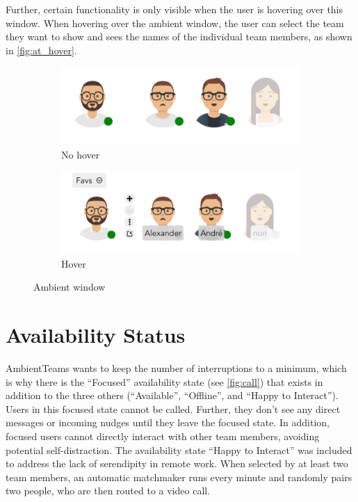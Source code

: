 Further, certain functionality is only visible when the user is hovering over this window. When hovering over the ambient window, the user can select the team they want to show and sees the names of the individual team members, as shown in \autoref{fig:at_hover}.

\begin{figure}[h]
    \centering
    \begin{subfigure}{.5\textwidth}
        \centering
        \includegraphics[width=.8\linewidth]{./images/AT_no_hover.png}
        \caption{No hover }
        \label{fig:at_no_hover}
    \end{subfigure}%
    \begin{subfigure}{.5\textwidth}
        \centering
        \includegraphics[width=.8\linewidth]{./images/AT_hover.png}
        \caption{Hover }
        \label{fig:at_hover}
    \end{subfigure}
    \caption{Ambient window}
\end{figure}

\section{Availability Status}
AmbientTeams wants to keep the number of interruptions to a minimum, which is why there is the \enquote{Focused} availability state (see \autoref{fig:call}) that exists in addition to the three others (\enquote{Available}, \enquote{Offline}, and \enquote{Happy to Interact}). Users in this focused state cannot be called. Further, they don't see any direct messages or incoming nudges until they leave the focused state. In addition, focused users cannot directly interact with other team members, avoiding potential self-distraction. The availability state \enquote{Happy to Interact} was included to address the lack of serendipity in remote work. When selected by at least two team members, an automatic matchmaker runs every minute and randomly pairs two people, who are then routed to a video call.


